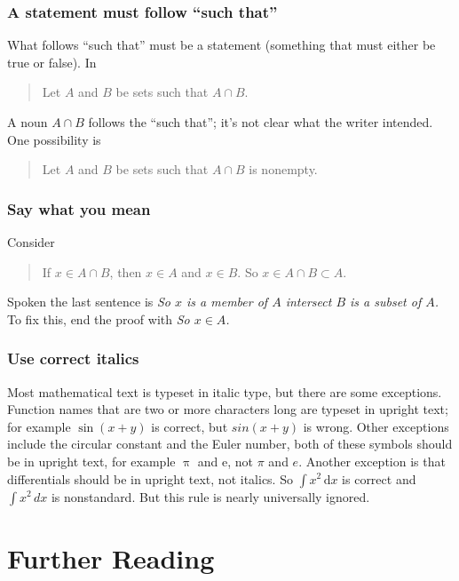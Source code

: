 \documentclass[12pt]{article}
\newcounter{ex}\setcounter{ex}{0}
\newcounter{id}\setcounter{id}{0}
\newcounter{se}\setcounter{se}{0}
\begin{document}
 \subsubsection{ A statement must follow ``such that'' }

What follows ``such that'' must be a statement (something that must either
be true or false).  In 

\begin{quote}
Let \(A\) and \(B\) be sets such that \(A \cap B\).
\end{quote}
A noun \(A \cap B\) follows the ``such that''; it's not clear what the writer intended.
One possibility is 
\begin{quote}
Let \(A\) and \(B\) be sets such that \(A \cap B\) is nonempty.
\end{quote}

 \subsubsection{ Say what you mean}

Consider
\begin{quote}
If \(x \in A \cap B\), then \(x \in A\) and \(x \in B\). So
\(x \in A \cap B \subset A\).
\end{quote}
Spoken the last sentence is 
 \emph{So \(x\) is a member of \(A\) intersect \(B\) is a subset of \(A\).} To fix this,
end the proof with \emph{So \(x \in A\).}


 \subsubsection{Use correct italics}
 
 Most mathematical text is typeset in italic type, but there are some exceptions. Function names that are two or more characters long are  typeset in upright text; for example \(\sin(x+y)\) is correct, but \(sin(x+y)\) is wrong.  Other
 exceptions include the circular constant and the Euler number, both  of these symbols should be in upright text, 
 for example \(\uppi\) and  \(\mathrm{e}\), not \(\pi\) and \(e\).  Another exception is  that differentials should be in 
 upright text, not italics.  So \(\int x^2 \, \mathrm{d} x\) is correct and \(\int x^2 \, d x\) is nonstandard. But this rule is nearly universally ignored.



\section*{Further Reading}
\end{document}
